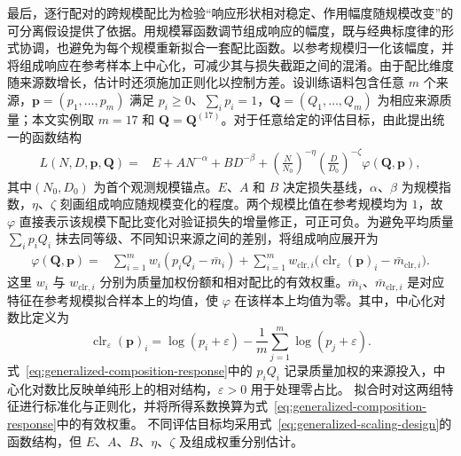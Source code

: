 \documentclass[bwprint]{gmcmthesis}
\begin{document}
最后，逐行配对的跨规模配比为检验“响应形状相对稳定、作用幅度随规模改变”的可分离假设提供了依据。用规模幂函数调节组成响应的幅度，既与经典标度律的形式协调，也避免为每个规模重新拟合一套配比函数。以参考规模归一化该幅度，并将组成响应在参考样本上中心化，可减少其与损失截距之间的混淆。由于配比维度随来源数增长，估计时还须施加正则化以控制方差。设训练语料包含任意 $m$ 个来源，$\mathbf p=(p_1,\ldots,p_m)$ 满足 $p_i\geq0$、$\sum_i p_i=1$，$\mathbf Q=(Q_1,\ldots,Q_m)$ 为相应来源质量；本文实例取 $m=17$ 和 $\mathbf Q=\mathbf Q^{(17)}$。对于任意给定的评估目标，由此提出统一的函数结构
\begin{equation}
    \begin{aligned}
        L(N,D,\mathbf p,\mathbf Q)
        ={} & E+A N^{-\alpha}
        +B D^{-\beta}
        +\left(\frac{N}{N_{0}}\right)^{-\eta}
        \left(\frac{D}{D_{0}}\right)^{-\zeta}
        \varphi(\mathbf Q,\mathbf p),
    \end{aligned}
    \label{eq:generalized-scaling-design}
\end{equation}
其中$(N_{0},D_{0})$ 为首个观测规模锚点。$E$、$A$ 和 $B$ 决定损失基线，$\alpha$、$\beta$ 为规模指数，$\eta$、$\zeta$ 刻画组成响应随规模变化的程度。两个规模比值在参考规模均为 $1$，故 $\varphi$ 直接表示该规模下配比变化对验证损失的增量修正，可正可负。为避免平均质量 $\sum_i p_iQ_i$ 抹去同等级、不同知识来源之间的差别，将组成响应展开为
\begin{equation}
    \begin{aligned}
        \varphi(\mathbf Q,\mathbf p)
        ={} & \sum_{i=1}^{m}w_i
        (p_iQ_i-\bar m_i) +\sum_{i=1}^{m}w_{\mathrm{clr},i}
        \bigl(\operatorname{clr}_{\varepsilon}(\mathbf p)_i
        -\bar m_{\mathrm{clr},i}\bigr).
    \end{aligned}
    \label{eq:generalized-composition-response}
\end{equation}
这里 $w_i$ 与 $w_{\mathrm{clr},i}$ 分别为质量加权份额和相对配比的有效权重。$\bar m_i$、$\bar m_{\mathrm{clr},i}$ 是对应特征在参考规模拟合样本上的均值，使 $\varphi$ 在该样本上均值为零。其中，中心化对数比定义为
\begin{equation}
    \operatorname{clr}_{\varepsilon}(\mathbf p)_i
    =\log(p_i+\varepsilon)
    -\frac{1}{m}\sum_{j=1}^{m}\log(p_j+\varepsilon).
    \label{eq:generalized-clr-definition}
\end{equation}
式~\eqref{eq:generalized-composition-response}中的 $p_iQ_i$ 记录质量加权的来源投入，中心化对数比反映单纯形上的相对结构，$\varepsilon>0$ 用于处理零占比。
拟合时对这两组特征进行标准化与正则化，并将所得系数换算为式~\eqref{eq:generalized-composition-response}中的有效权重。
不同评估目标均采用式~\eqref{eq:generalized-scaling-design}的函数结构，但 $E$、$A$、$B$、$\eta$、$\zeta$ 及组成权重分别估计。
\end{document}
